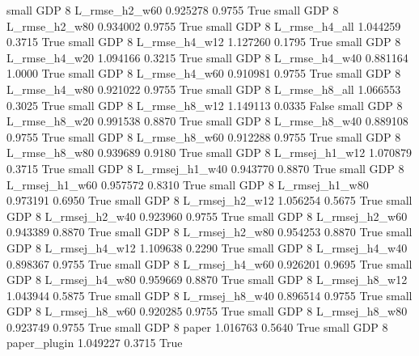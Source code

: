      small      GDP                 8  L_rmse_h2_w60   0.925278      0.9755    True
     small      GDP                 8  L_rmse_h2_w80   0.934002      0.9755    True
     small      GDP                 8  L_rmse_h4_all   1.044259      0.3715    True
     small      GDP                 8  L_rmse_h4_w12   1.127260      0.1795    True
     small      GDP                 8  L_rmse_h4_w20   1.094166      0.3215    True
     small      GDP                 8  L_rmse_h4_w40   0.881164      1.0000    True
     small      GDP                 8  L_rmse_h4_w60   0.910981      0.9755    True
     small      GDP                 8  L_rmse_h4_w80   0.921022      0.9755    True
     small      GDP                 8  L_rmse_h8_all   1.066553      0.3025    True
     small      GDP                 8  L_rmse_h8_w12   1.149113      0.0335   False
     small      GDP                 8  L_rmse_h8_w20   0.991538      0.8870    True
     small      GDP                 8  L_rmse_h8_w40   0.889108      0.9755    True
     small      GDP                 8  L_rmse_h8_w60   0.912288      0.9755    True
     small      GDP                 8  L_rmse_h8_w80   0.939689      0.9180    True
     small      GDP                 8 L_rmsej_h1_w12   1.070879      0.3715    True
     small      GDP                 8 L_rmsej_h1_w40   0.943770      0.8870    True
     small      GDP                 8 L_rmsej_h1_w60   0.957572      0.8310    True
     small      GDP                 8 L_rmsej_h1_w80   0.973191      0.6950    True
     small      GDP                 8 L_rmsej_h2_w12   1.056254      0.5675    True
     small      GDP                 8 L_rmsej_h2_w40   0.923960      0.9755    True
     small      GDP                 8 L_rmsej_h2_w60   0.943389      0.8870    True
     small      GDP                 8 L_rmsej_h2_w80   0.954253      0.8870    True
     small      GDP                 8 L_rmsej_h4_w12   1.109638      0.2290    True
     small      GDP                 8 L_rmsej_h4_w40   0.898367      0.9755    True
     small      GDP                 8 L_rmsej_h4_w60   0.926201      0.9695    True
     small      GDP                 8 L_rmsej_h4_w80   0.959669      0.8870    True
     small      GDP                 8 L_rmsej_h8_w12   1.043944      0.5875    True
     small      GDP                 8 L_rmsej_h8_w40   0.896514      0.9755    True
     small      GDP                 8 L_rmsej_h8_w60   0.920285      0.9755    True
     small      GDP                 8 L_rmsej_h8_w80   0.923749      0.9755    True
     small      GDP                 8          paper   1.016763      0.5640    True
     small      GDP                 8   paper_plugin   1.049227      0.3715    True